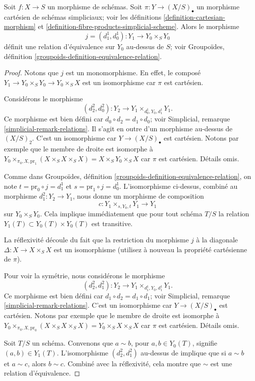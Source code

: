 \begin{lemma}
\label{lemma-equivalence-relation}
Soit $f : X \to S$ un morphisme de schémas.
Soit $\pi : Y \to (X/S)_\bullet$ un morphisme cartésien de schémas
simpliciaux; voir les définitions \ref{definition-cartesian-morphism} et
\ref{definition-fibre-products-simplicial-scheme}.
Alors le morphisme
$$
j = (d^1_1, d^1_0) : Y_1 \to Y_0 \times_S Y_0
$$
définit une relation d'équivalence sur $Y_0$ au-dessus de $S$;
voir Groupoïdes, définition \ref{groupoids-definition-equivalence-relation}.
\end{lemma}

\begin{proof}
Notons que $j$ est un monomorphisme. En effet, le composé
$Y_1 \to Y_0 \times_S Y_0 \to Y_0 \times_S X$
est un isomorphisme car $\pi$ est cartésien.

\medskip\noindent
Considérons le morphisme
$$
(d^2_2, d^2_0) : Y_2 \to Y_1 \times_{d^1_0, Y_0, d^1_1} Y_1.
$$
Ce morphisme est bien défini car $d_0 \circ d_2 = d_1 \circ d_0$;
voir Simplicial, remarque \ref{simplicial-remark-relations}.
Il s'agit en outre d'un morphisme au-dessus de $(X/S)_2$. C'est un isomorphisme
car $Y \to (X/S)_\bullet$ est cartésien. Notons par exemple que le membre
de droite est isomorphe à
$Y_0 \times_{\pi_0, X, \text{pr}_1} (X \times_S X \times_S X) =
X \times_S Y_0 \times_S X$
car $\pi$ est cartésien. Détails omis.

\medskip\noindent
Comme dans Groupoïdes, définition \ref{groupoids-definition-equivalence-relation},
on note $t = \text{pr}_0 \circ j = d^1_1$ et
$s = \text{pr}_1 \circ j = d^1_0$.
L'isomorphisme ci-dessus, combiné au morphisme
$d^2_1 : Y_2 \to Y_1$, nous donne un morphisme de composition
$$
c : Y_1 \times_{s, Y_0, t} Y_1 \longrightarrow Y_1
$$
sur $Y_0 \times_S Y_0$. Cela implique immédiatement
que pour tout schéma $T/S$ la relation
$Y_1(T) \subset Y_0(T) \times Y_0(T)$ est transitive.

\medskip\noindent
La réflexivité découle du fait que la restriction
du morphisme $j$ à la diagonale
$\Delta : X \to X \times_S X$ est un isomorphisme
(utilisez à nouveau la propriété cartésienne de $\pi$).

\medskip\noindent
Pour voir la symétrie, nous considérons le morphisme
$$
(d^2_2, d^2_1) : Y_2 \to Y_1 \times_{d^1_1, Y_0, d^1_1} Y_1.
$$
Ce morphisme est bien défini car $d_1 \circ d_2 = d_1 \circ d_1$;
voir Simplicial, remarque \ref{simplicial-remark-relations}.
C'est un isomorphisme
car $Y \to (X/S)_\bullet$ est cartésien.
Notons par exemple que le membre
de droite est isomorphe à
$Y_0 \times_{\pi_0, X, \text{pr}_0} (X \times_S X \times_S X) =
Y_0 \times_S X \times_S X$
car $\pi$ est cartésien. Détails omis.

\medskip\noindent
Soit $T/S$ un schéma. Convenons que $a \sim b$, pour $a, b \in Y_0(T)$,
signifie $(a, b) \in Y_1(T)$.
L'isomorphisme $(d^2_2, d^2_1)$ au-dessus de
implique que si $a \sim b$ et $a \sim c$, alors $b \sim c$.
Combiné avec la réflexivité, cela montre que $\sim$ est
une relation d'équivalence.
\end{proof}







